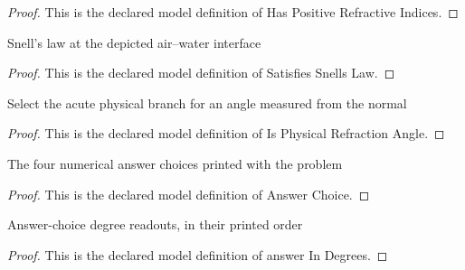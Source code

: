\begin{proof}
  This is the declared model definition of Has Positive Refractive Indices.
\end{proof}
\begin{definition}
  \label{def:physics:phyx-mini-0001:phyxminiproblems-problemphyxmini0001-satisfiessnellslaw}
  Snell's law at the depicted air--water interface
\end{definition}
\begin{proof}
  This is the declared model definition of Satisfies Snells Law.
\end{proof}
\begin{definition}
  \label{def:physics:phyx-mini-0001:phyxminiproblems-problemphyxmini0001-isphysicalrefractionangle}
  Select the acute physical branch for an angle measured from the normal
\end{definition}
\begin{proof}
  This is the declared model definition of Is Physical Refraction Angle.
\end{proof}
\begin{definition}
  \label{def:physics:phyx-mini-0001:phyxminiproblems-problemphyxmini0001-answerchoice}
  The four numerical answer choices printed with the problem
\end{definition}
\begin{proof}
  This is the declared model definition of Answer Choice.
\end{proof}
\begin{definition}
  \label{def:physics:phyx-mini-0001:phyxminiproblems-problemphyxmini0001-answerindegrees}
  Answer-choice degree readouts, in their printed order
\end{definition}
\begin{proof}
  This is the declared model definition of answer In Degrees.
\end{proof}
